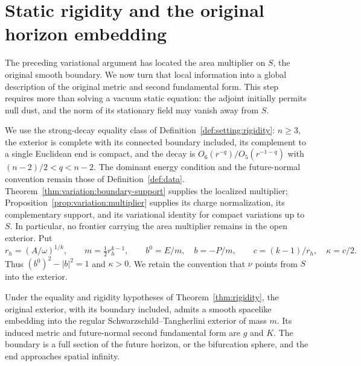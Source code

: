 \section{Static rigidity and the original horizon embedding}
\label{sec:static}

The preceding variational argument has located the area multiplier on
$S$, the original smooth boundary.  We now turn that local information
into a global description of the original metric and second fundamental
form.  This step requires more than solving a vacuum static equation:
the adjoint initially permits null dust, and the norm of its stationary
field may vanish away from $S$.

We use the strong-decay equality class of
Definition~\ref{def:setting:rigidity}: $n\geq3$, the exterior is complete
with its connected boundary included, its complement to a single
Euclidean end is compact, and the decay is $O_6(r^{-q})/O_5(r^{-1-q})$
with $(n-2)/2<q<n-2$.  The dominant energy condition and the
future-normal convention remain those of Definition~\ref{def:data}.
Theorem~\ref{thm:variation:boundary-support} supplies the localized
multiplier; Proposition~\ref{prop:variation:multiplier} supplies its
charge normalization, its complementary support, and its variational
identity for compact variations up to $S$.  In particular, no frontier
carrying the area multiplier remains in the open exterior.  Put
\begin{equation}\label{eq:static:constants}
 r_h=(A/\omega)^{1/k},\qquad m=\tfrac12r_h^{k-1},\qquad
 b^0=E/m,\quad b=-P/m,\qquad c=(k-1)/r_h,\quad\kappa=c/2.
\end{equation}
Thus $(b^0)^2-|b|^2=1$ and $\kappa>0$.  We retain the convention that
$\nu$ points from $S$ into the exterior.

\begin{theorem}\label{thm:static:classification}
Under the equality and rigidity hypotheses of Theorem~\ref{thm:rigidity},
the original exterior, with its boundary included, admits a smooth
spacelike embedding into the regular Schwarzschild--Tangherlini exterior
of mass $m$.  Its induced metric and future-normal second fundamental
form are $g$ and $K$.  The boundary is a full section of the future
horizon, or the bifurcation sphere, and the end approaches spatial
infinity.
\end{theorem}

